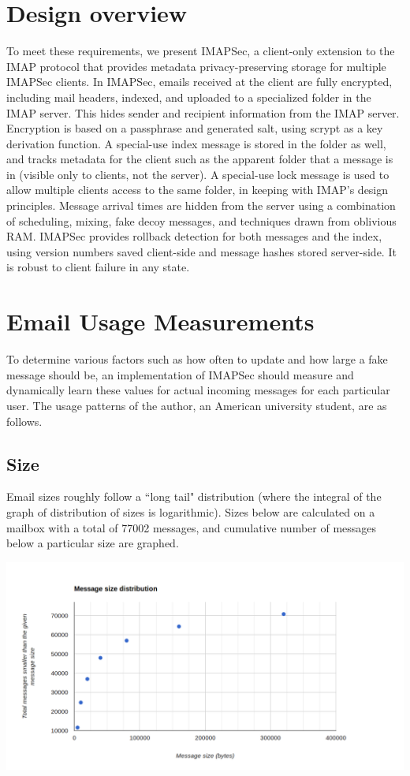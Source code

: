 \documentclass[pageno]{jpaper}
\newcommand{\project}{IMAPSec }
\newcommand{\projectnospace}{IMAPSec}
\begin{document}
\section{Design overview}
To meet these requirements, we present \projectnospace, a client-only extension to the IMAP protocol that provides metadata privacy-preserving storage for multiple \project clients. In \projectnospace, emails received at the client are fully encrypted, including mail headers, indexed, and uploaded to a specialized folder in the IMAP server. This hides sender and recipient information from the IMAP server. Encryption is based on a passphrase and generated salt, using scrypt as a key derivation function. A special-use index message is stored in the folder as well, and tracks metadata for the client such as the apparent folder that a message is in (visible only to clients, not the server). A special-use lock message is used to allow multiple clients access to the same folder, in keeping with IMAP's design principles. Message arrival times are hidden from the server using a combination of scheduling, mixing, fake decoy messages, and techniques drawn from oblivious RAM. \project provides rollback detection for both messages and the index, using version numbers saved client-side and message hashes stored server-side. It is robust to client failure in any state.

\section{Email Usage Measurements}
To determine various factors such as how often to update and how large a fake message should be, an implementation of \project should measure and dynamically learn these values for actual incoming messages for each particular user. The usage patterns of the author, an American university student, are as follows.

\subsection{Size}

Email sizes roughly follow a ``long tail" distribution (where the integral of the graph of distribution of sizes is logarithmic). Sizes below are calculated on a mailbox with a total of 77002 messages, and cumulative number of messages below a particular size are graphed.

\includegraphics[width=\textwidth]{message-size-dist}
\end{document}
